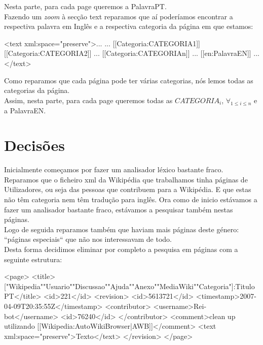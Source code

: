 \documentclass[11pt,a4paper]{article}
\begin{document}
Nesta parte, para cada \textsf{page} queremos a \textsf{PalavraPT}.\\

Fazendo um \textit{zoom} à secção \textsf{text} reparamos que aí poderíamos encontrar a respectiva palavra em Inglês e a respectiva categoria da página em que estamos:\\

\begin{code_xml}
  <text xml:space="preserve">...
  ...
  [[Categoria:CATEGORIA1]]
  [[Categoria:CATEGORIA2]]
  ...
  [[Categoria:CATEGORIAn]]
  ...
  [[en:PalavraEN]]
  ...
  </text>
\end{code_xml}

Como reparamos que cada página pode ter várias categorias, nós lemos todas as categorias da página.\\

Assim, nesta parte, para cada \textsf{page} queremos todas as \textbf{$CATEGORIA_i$}, $\forall_{1 \leq i \leq n}$ e a \textsf{PalavraEN}.

\section{Decisões}
Inicialmente começamos por fazer um analisador léxico bastante fraco. Reparamos que o ficheiro xml da Wikipédia que trabalhamos tinha páginas de Utilizadores, ou seja das pessoas que contribuem para a Wikipédia. E que estas não têm categoria nem têm tradução para inglês. Ora como de inicio estávamos a fazer um analisador bastante fraco, estávamos a pesquisar também nestas páginas.\\
Logo de seguida reparamos também que haviam mais páginas deste género: ``páginas especiais`` que não nos interessavam de todo.\\
Desta forma decidimos eliminar por completo a pesquisa em páginas com a seguinte estrutura:

\begin{code_xml}
  <page>
    <title>["Wikipedia""Usuario""Discussao""Ajuda""Anexo""MediaWiki""Categoria"]:TituloPT</title>
    <id>221</id>
    <revision>
      <id>5613721</id>
      <timestamp>2007-04-09T20:35:55Z</timestamp>
      <contributor>
        <username>Rei-bot</username>
        <id>76240</id>
      </contributor>
      <comment>clean up  utilizando [[Wikipedia:AutoWikiBrowser|AWB]]</comment>
      <text xml:space="preserve">Texto</text>
    </revision>
  </page>
\end{code_xml}
\end{document}
